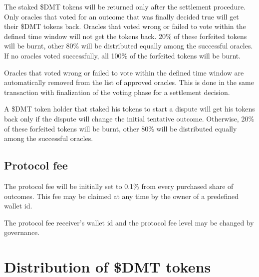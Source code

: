 \documentclass[12pt]{article}
\begin{document}
The staked \$DMT tokens will be returned only after the settlement procedure. Only oracles that voted for an outcome that was finally decided true will get their \$DMT tokens back. Oracles that voted wrong or failed to vote within the defined time window will not get the tokens back. 20\% of these forfeited tokens will be burnt, other 80\% will be distributed equally among the successful oracles. If no oracles voted successfully, all 100\% of the forfeited tokens will be burnt.

Oracles that voted wrong or failed to vote within the defined time window are automatically removed from the list of approved oracles. This is done in the same transaction with finalization of the voting phase for a settlement decision.

A \$DMT token holder that staked his tokens to start a dispute will get his tokens back only if the dispute will change the initial tentative outcome. Otherwise, 20\% of these forfeited tokens will be burnt, other 80\% will be distributed equally among the successful oracles.

\subsection{Protocol fee}
The protocol fee will be initially set to 0.1\% from every purchased share of outcomes. This fee may be claimed at any time by the owner of a predefined wallet id.

The protocol fee receiver's wallet id and the protocol fee level may be changed by governance.


\section{Distribution of \$DMT tokens}
\end{document}
